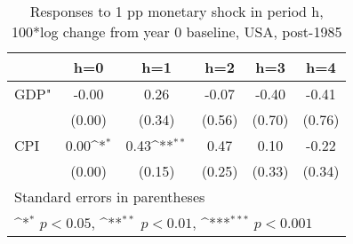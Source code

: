 \begin{table}[htbp]\centering
\def\sym#1{\ifmmode^{#1}\else\(^{#1}\)\fi}
\caption{Responses to 1 pp monetary shock in period h, 100*log change from year 0 baseline, USA, post-1985}
\begin{tabular}{l*{5}{c}}
\hline\hline
            &\multicolumn{1}{c}{h=0}&\multicolumn{1}{c}{h=1}&\multicolumn{1}{c}{h=2}&\multicolumn{1}{c}{h=3}&\multicolumn{1}{c}{h=4}\\
\hline
GDP"        &       -0.00         &        0.26         &       -0.07         &       -0.40         &       -0.41         \\
            &      (0.00)         &      (0.34)         &      (0.56)         &      (0.70)         &      (0.76)         \\
[1em]
CPI         &        0.00\sym{*}  &        0.43\sym{**} &        0.47         &        0.10         &       -0.22         \\
            &      (0.00)         &      (0.15)         &      (0.25)         &      (0.33)         &      (0.34)         \\
\hline\hline
\multicolumn{6}{l}{\footnotesize Standard errors in parentheses}\\
\multicolumn{6}{l}{\footnotesize \sym{*} \(p<0.05\), \sym{**} \(p<0.01\), \sym{***} \(p<0.001\)}\\
\end{tabular}
\end{table}
